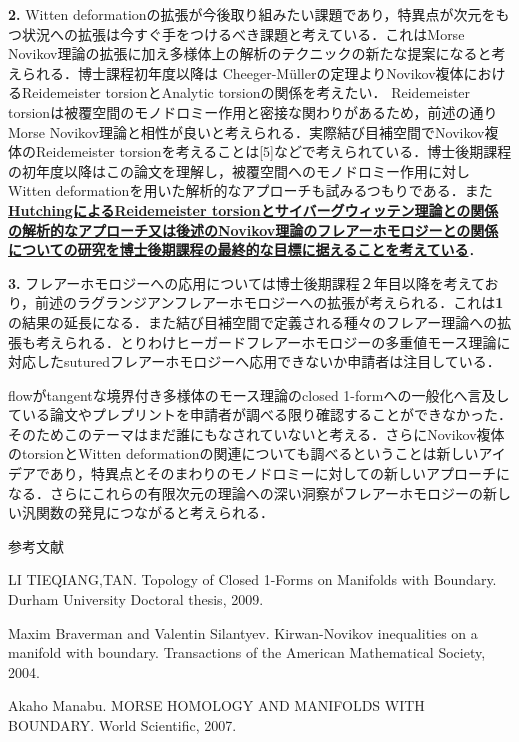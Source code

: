 \documentclass[11pt,a4j,dvipdfmx]{jarticle} 					%
\newcommand{\研究課題名}{象の卵}
\newcommand{\研究機関名}{京都大学}
\newcommand{\研究代表者氏名}{福士謙二}
\begin{document}
\noindent
\textbf{2. }Witten deformationの拡張が今後取り組みたい課題であり，特異点が次元をもつ状況への拡張は今すぐ手をつけるべき課題と考えている．これはMorse Novikov理論の拡張に加え多様体上の解析のテクニックの新たな提案になると考えられる．博士課程初年度以降は
Cheeger-M\"{u}llerの定理よりNovikov複体におけるReidemeister torsionとAnalytic torsionの関係を考えたい．
Reidemeister torsionは被覆空間のモノドロミー作用と密接な関わりがあるため，前述の通りMorse Novikov理論と相性が良いと考えられる．実際結び目補空間でNovikov複体のReidemeister torsionを考えることは[5]などで考えられている．博士後期課程の初年度以降はこの論文を理解し，被覆空間へのモノドロミー作用に対しWitten deformationを用いた解析的なアプローチも試みるつもりである．また\textbf{\ul{HutchingによるReidemeister torsionとサイバーグウィッテン理論との関係の解析的なアプローチ又は後述のNovikov理論のフレアーホモロジーとの関係についての研究を博士後期課程の最終的な目標に据えることを考えている}}．



\noindent
\textbf{3. }フレアーホモロジーへの応用については博士後期課程２年目以降を考えており，前述のラグランジアンフレアーホモロジーへの拡張が考えられる．これは\textbf{1}の結果の延長になる．また結び目補空間で定義される種々のフレアー理論への拡張も考えられる．とりわけヒーガードフレアーホモロジーの多重値モース理論に対応したsuturedフレアーホモロジーへ応用できないか申請者は注目している．




\noindent
{}

flowがtangentな境界付き多様体のモース理論のclosed 1-formへの一般化へ言及している論文やプレプリントを申請者が調べる限り確認することができなかった．そのためこのテーマはまだ誰にもなされていないと考える．さらにNovikov複体のtorsionとWitten deformationの関連についても調べるということは新しいアイデアであり，特異点とそのまわりのモノドロミーに対しての新しいアプローチになる．さらにこれらの有限次元の理論への深い洞察がフレアーホモロジーの新しい汎関数の発見につながると考えられる．

\vspace{2mm}
\noindent 参考文献

\noindent
[1] LI TIEQIANG,TAN. Topology of Closed 1-Forms on Manifolds with Boundary. Durham University Doctoral thesis, 2009.

\noindent
[2] Maxim Braverman and Valentin Silantyev. Kirwan-Novikov inequalities on a manifold with boundary. Transactions of the American Mathematical Society, 2004.

\noindent
[3] Akaho Manabu. MORSE HOMOLOGY AND MANIFOLDS WITH BOUNDARY. World Scientific, 2007.
\end{document}
